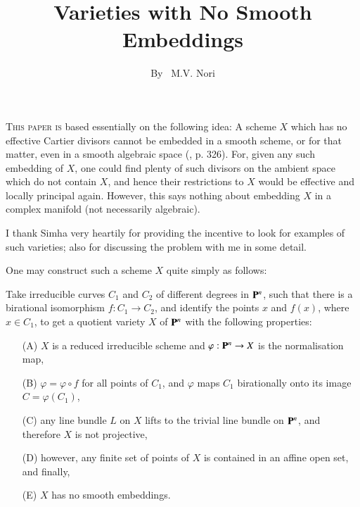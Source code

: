 \title{Varieties with No Smooth Embeddings}\label{art19}

\author{By~ M.V. Nori}

\date{}
\maketitle

\setcounter{page}{283}

\setcounter{pageoriginal}{240}
\textsc{This paper is }\pageoriginale based essentially on the following idea: A scheme $X$ which has no effective Cartier divisors cannot be embedded in a smooth scheme, or for that matter, even in a smooth algebraic space (\cite{art19-key1}, p. 326). For, given any such embedding of $X$, one could find plenty of such divisors on the ambient space which do not contain $X$, and hence their restrictions to $X$ would be effective and locally principal again. However, this says nothing about embedding $X$ in a complex manifold (not necessarily algebraic).

I thank Simha very heartily for providing the incentive to look for examples of such varieties; also for discussing the problem with me in some detail.

One may construct such a scheme $X$ quite simply as follows:

Take irreducible curves $C_1$ and $C_2$ of different degrees in $\mathbf{P}^n$, such that there is a birational isomorphism $f: C_1 \to C_2$, and identify the points $x$ and $f(x)$, where $x \in C_1$, to get a quotient variety $X$ of $\mathbf{P}^n$ with the following properties:
\begin{itemize}
\item[(A)] $X$ is a reduced irreducible scheme and $\varphi: \mathbf{P}^n \to X$ is the normalisation map,

\item[(B)] $\varphi = \varphi \circ f$ for all points of $C_1$, and $\varphi$ maps $C_1$ birationally onto its image $C = \varphi (C_1)$,

\item[(C)] any line bundle $L$ on $X$ lifts to the trivial line bundle on $\mathbf{P}^n$, and therefore $X$ is not projective,

\item[(D)] however, any finite set of points of $X$ is contained in an affine open set, and finally,

\item[(E)] $X$ has no smooth embeddings.
\end{itemize}

